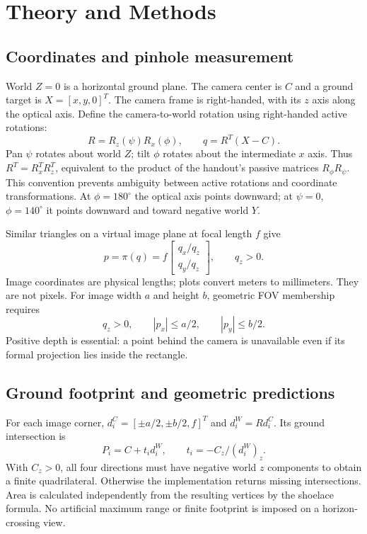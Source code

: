 \documentclass[11pt,letterpaper]{article}
\begin{document}
\section{Theory and Methods}
\subsection{Coordinates and pinhole measurement}
World $Z=0$ is a horizontal ground plane. The camera center is $C$ and a ground target is $X=[x,y,0]^T$. The camera frame is right-handed, with its $z$ axis along the optical axis. Define the camera-to-world rotation using right-handed active rotations:
\begin{equation}
R=R_z(\psi)R_x(\phi),\qquad q=R^T(X-C).
\label{eq:pose}
\end{equation}
Pan $\psi$ rotates about world $Z$; tilt $\phi$ rotates about the intermediate $x$ axis. Thus $R^T=R_x^TR_z^T$, equivalent to the product of the handout's passive matrices $R_\phi R_\psi$. This convention prevents ambiguity between active rotations and coordinate transformations. At $\phi=180^\circ$ the optical axis points downward; at $\psi=0$, $\phi=140^\circ$ it points downward and toward negative world $Y$.

Similar triangles on a virtual image plane at focal length $f$ give
\begin{equation}
p=\pi(q)=f\begin{bmatrix}q_x/q_z\\q_y/q_z\end{bmatrix},\qquad q_z>0.
\label{eq:projection}
\end{equation}
Image coordinates are physical lengths; plots convert meters to millimeters. They are not pixels. For image width $a$ and height $b$, geometric FOV membership requires
\begin{equation}
q_z>0,\qquad |p_x|\leq a/2,\qquad |p_y|\leq b/2.
\label{eq:fov}
\end{equation}
Positive depth is essential: a point behind the camera is unavailable even if its formal projection lies inside the rectangle.

\subsection{Ground footprint and geometric predictions}
For each image corner, $d_i^C=[\pm a/2,\pm b/2,f]^T$ and $d_i^W=Rd_i^C$. Its ground intersection is
\begin{equation}
P_i=C+t_i d_i^W,\qquad t_i=-C_z/(d_i^W)_z.
\label{eq:ray}
\end{equation}
With $C_z>0$, all four directions must have negative world $z$ components to obtain a finite quadrilateral. Otherwise the implementation returns missing intersections. Area is calculated independently from the resulting vertices by the shoelace formula. No artificial maximum range or finite footprint is imposed on a horizon-crossing view.
\end{document}
